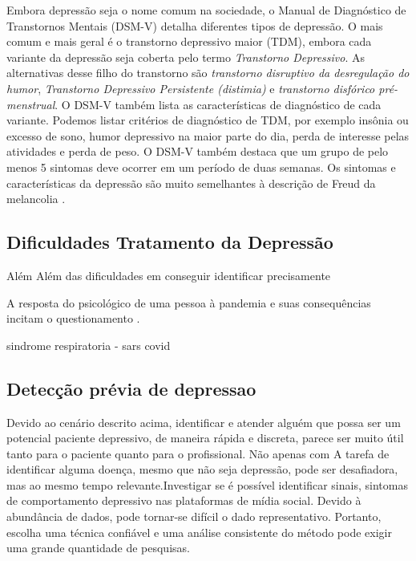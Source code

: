 \documentclass[11pt, notitlepage]{article} %
\begin{document}
Embora depressão seja o nome comum na sociedade, o Manual de Diagnóstico de Transtornos Mentais (DSM-V) detalha diferentes tipos de depressão. O mais comum e mais geral é o transtorno depressivo maior (TDM), embora cada variante da depressão seja coberta pelo termo \textit{Transtorno Depressivo}. As alternativas desse filho do transtorno são \textit{transtorno disruptivo da desregulação do humor}, \textit{Transtorno Depressivo Persistente (distimia)} e \textit{transtorno disfórico pré-menstrual}. O DSM-V também lista as características de diagnóstico de cada variante. Podemos listar critérios de diagnóstico de TDM, por exemplo insônia ou excesso de sono, humor depressivo na maior parte do dia, perda de interesse pelas atividades e perda de peso. O DSM-V também destaca que um grupo de pelo menos 5 sintomas deve ocorrer em um período de duas semanas.
Os sintomas e características da depressão são muito semelhantes à descrição de Freud da melancolia \cite{freud1917mourning}.

\subsection*{Dificuldades Tratamento da Depressão}
Além 
Além das dificuldades em conseguir identificar precisamente 

A resposta do psicológico de uma pessoa à pandemia e suas consequências incitam o questionamento  .

sindrome respiratoria - sars
covid

\subsection*{Detecção prévia de depressao}
Devido ao cenário descrito acima, identificar e atender alguém que possa ser um potencial paciente depressivo, de maneira rápida e discreta, parece ser muito útil tanto para o paciente quanto para o profissional. Não apenas com
A tarefa de identificar alguma doença, mesmo que não seja depressão, pode ser desafiadora, mas ao mesmo tempo relevante.Investigar se é possível identificar sinais, sintomas de comportamento depressivo nas plataformas de mídia social.
Devido à abundância de dados, pode tornar-se difícil o dado representativo. Portanto, escolha uma técnica confiável e uma análise consistente do método pode exigir uma grande quantidade de pesquisas.

\newpage
\end{document}
